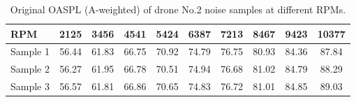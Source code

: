 \begin{table}[ht]
\caption{Original OASPL (A-weighted) of drone No.2 noise samples at different RPMs.}
\vskip3pt
\setlength{\tabcolsep}{6pt}
\begin{tabular}{l|ccccccccc}
\hline\hline
RPM & 2125 & 3456 & 4541 & 5424 & 6387 & 7213 & 8467 & 9423 & 10377 \\
\hline
Sample 1 & 56.44 & 61.83 & 66.75 & 70.92 & 74.79 & 76.75 & 80.93 & 84.36 & 87.84 \\
Sample 2 & 56.27 & 61.95 & 66.78 & 70.51 & 74.94 & 76.68 & 81.02 & 84.79 & 88.29 \\
Sample 3 & 56.57 & 61.81 & 66.86 & 70.65 & 74.83 & 76.72 & 81.01 & 84.85 & 89.03 \\
\hline\hline
\end{tabular}
\label{drone2OASPL}
\end{table}
